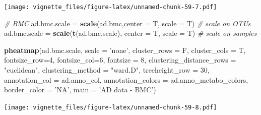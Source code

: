 \documentclass[]{book}
\newenvironment{Shaded}{\begin{snugshade}}{\end{snugshade}}
\newcommand{\KeywordTok}[1]{\textcolor[rgb]{0.13,0.29,0.53}{\textbf{#1}}}
\newcommand{\DataTypeTok}[1]{\textcolor[rgb]{0.13,0.29,0.53}{#1}}
\newcommand{\DecValTok}[1]{\textcolor[rgb]{0.00,0.00,0.81}{#1}}
\newcommand{\StringTok}[1]{\textcolor[rgb]{0.31,0.60,0.02}{#1}}
\newcommand{\CommentTok}[1]{\textcolor[rgb]{0.56,0.35,0.01}{\textit{#1}}}
\newcommand{\NormalTok}[1]{#1}
\begin{document}
\texttt{[image: vignette\_files/figure-latex/unnamed-chunk-59-7.pdf]}

\begin{Shaded}
\begin{Highlighting}[]
\CommentTok{# BMC}
\NormalTok{ad.bmc.scale =}\StringTok{ }\KeywordTok{scale}\NormalTok{(ad.bmc,}\DataTypeTok{center =}\NormalTok{ T, }\DataTypeTok{scale =}\NormalTok{ T) }\CommentTok{# scale on OTUs}
\NormalTok{ad.bmc.scale =}\StringTok{ }\KeywordTok{scale}\NormalTok{(}\KeywordTok{t}\NormalTok{(ad.bmc.scale), }\DataTypeTok{center =}\NormalTok{ T, }\DataTypeTok{scale =}\NormalTok{ T) }\CommentTok{# scale on samples}

\KeywordTok{pheatmap}\NormalTok{(ad.bmc.scale, }
         \DataTypeTok{scale =} \StringTok{'none'}\NormalTok{, }
         \DataTypeTok{cluster_rows =}\NormalTok{ F, }
         \DataTypeTok{cluster_cols =}\NormalTok{ T, }
         \DataTypeTok{fontsize_row=}\DecValTok{4}\NormalTok{, }\DataTypeTok{fontsize_col=}\DecValTok{6}\NormalTok{,}
         \DataTypeTok{fontsize =} \DecValTok{8}\NormalTok{,}
         \DataTypeTok{clustering_distance_rows =} \StringTok{"euclidean"}\NormalTok{,}
         \DataTypeTok{clustering_method =} \StringTok{"ward.D"}\NormalTok{,}
         \DataTypeTok{treeheight_row =} \DecValTok{30}\NormalTok{,}
         \DataTypeTok{annotation_col =}\NormalTok{ ad.anno_col,}
         \DataTypeTok{annotation_colors =}\NormalTok{ ad.anno_metabo_colors,}
         \DataTypeTok{border_color =} \StringTok{'NA'}\NormalTok{,}
         \DataTypeTok{main =} \StringTok{'AD data - BMC'}\NormalTok{)}
\end{Highlighting}
\end{Shaded}

\texttt{[image: vignette\_files/figure-latex/unnamed-chunk-59-8.pdf]}
\end{document}
